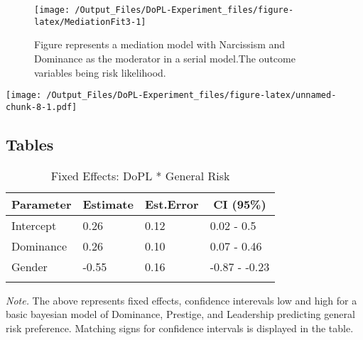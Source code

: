 \documentclass[
  donotrepeattitle,doc, 12pt, a4paper,floatsintext]{apa7}
\begin{document}
\begin{figure}

{\centering \texttt{[image: /Output\_Files/DoPL-Experiment\_files/figure-latex/MediationFit3-1]} 

}

\caption{Figure represents a mediation model with Narcissism and Dominance as the moderator in a serial model.The outcome variables being risk likelihood.}\label{fig:MediationFit3}
\end{figure}

\newpage

\texttt{[image: /Output\_Files/DoPL-Experiment\_files/figure-latex/unnamed-chunk-8-1.pdf]}

\hypertarget{tables}{%
\subsection{Tables}\label{tables}}

\begin{table}[ht]

\begin{center}
\begin{threeparttable}

\caption{\label{tab:m1-fixef-Experiment-1}Fixed Effects: DoPL * General Risk}

\small{

\begin{tabular}{llll}
\toprule
Parameter & \multicolumn{1}{c}{Estimate} & \multicolumn{1}{c}{Est.Error} & \multicolumn{1}{c}{CI (95\%)}\\
\midrule
Intercept & 0.26 & 0.12 & 0.02 - 0.5\\
Dominance & 0.26 & 0.10 & 0.07 - 0.46\\
Gender & -0.55 & 0.16 & -0.87 - -0.23\\
\bottomrule
\addlinespace
\end{tabular}

}

\begin{tablenotes}[para]
\normalsize{\textit{Note.} The above represents fixed effects, confidence interevals low and high for a basic bayesian model of Dominance, Prestige, and Leadership predicting general risk preference. Matching signs for confidence intervals is displayed in the table.}
\end{tablenotes}

\end{threeparttable}
\end{center}

\end{table}
\end{document}
